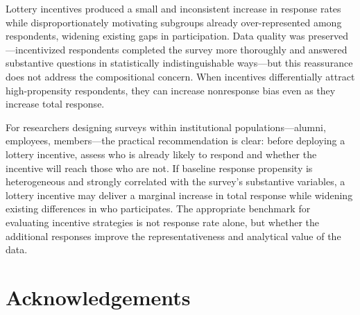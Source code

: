 Lottery incentives produced a small and inconsistent increase in response rates while
disproportionately motivating subgroups already over-represented among respondents,
widening existing gaps in participation. Data quality was preserved---incentivized
respondents completed the survey more thoroughly and answered substantive questions in
statistically indistinguishable ways---but this reassurance does not address the
compositional concern. When incentives differentially attract high-propensity
respondents, they can increase nonresponse bias even as they increase total response.

For researchers designing surveys within institutional populations---alumni, employees,
members---the practical recommendation is clear: before deploying a lottery incentive,
assess who is already likely to respond and whether the incentive will reach those who
are not. If baseline response propensity is heterogeneous and strongly correlated with
the survey's substantive variables, a lottery incentive may deliver a marginal increase
in total response while widening existing differences in who participates. The
appropriate benchmark for evaluating incentive strategies is not response rate alone, but
whether the additional responses improve the representativeness and analytical value of
the data.

\section*{Acknowledgements}

